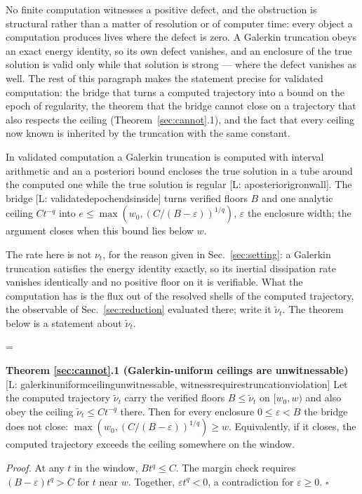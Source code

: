 \documentclass[letterpaper,twocolumn]{article}
\newcommand{\lean}[1]{{\footnotesize\def\_{\textunderscore\allowbreak}%
\hspace{0pt}[L: {\ttfamily\fontdimen3\font=2pt\fontdimen4\font=1pt #1}]}}
\begin{document}
No finite computation witnesses a positive defect, and the obstruction is
structural rather than a matter of resolution or of computer time: every
object a computation produces lives where the defect is zero. A Galerkin
truncation obeys an exact energy identity, so its own defect vanishes,
and an enclosure of the true solution is valid only while that solution
is strong --- where the defect vanishes as well. The rest of this
paragraph makes the statement precise for validated computation: the
bridge that turns a computed trajectory into a bound on the epoch of
regularity, the theorem that the bridge cannot close on a trajectory that
also respects the ceiling (Theorem~\ref{sec:cannot}.1), and the fact that
every ceiling now known is inherited by the truncation with the same
constant.

In validated computation \cite{CheHou23} a Galerkin truncation is
computed with interval arithmetic and an a posteriori bound encloses the
true solution in a tube around the computed one while the true solution
is regular \lean{aposteriori\_gronwall}. The bridge
\lean{validated\_epoch\_ends\_inside} turns verified floors $B$ and one
analytic ceiling $Ct^{-q}$ into $e \leq \max(w_0,
(C/(B-\varepsilon))^{1/q})$, $\varepsilon$ the enclosure width; the
argument closes when this bound lies below $w$.

The rate here is not $\nu_t$, for the reason given in
Sec.~\ref{sec:setting}: a Galerkin truncation satisfies the energy
identity exactly, so its inertial dissipation rate vanishes identically
and no positive floor on it is verifiable. What the computation has is
the flux out of the resolved shells of the computed trajectory, the
observable of Sec.~\ref{sec:reduction} evaluated there; write it
$\tilde\nu_t$. The theorem below is a statement about $\tilde\nu_t$.

\begin{list}{}{\leftmargin=\parindent\rightmargin=0pt}
\item
\textbf{Theorem \ref{sec:cannot}.1 (Galerkin-uniform ceilings are
unwitnessable)}
\lean{galerkin\_uniform\_ceiling\_unwitnessable,
witness\_requires\_truncation\_violation}
Let the computed trajectory $\tilde\nu_t$ carry the verified floors $B
\leq \tilde\nu_t$ on $[w_0,w)$ and also obey the ceiling $\tilde\nu_t \leq
C t^{-q}$ there. Then for every enclosure $0 \leq \varepsilon < B$ the bridge
does not close: $\max(w_0,(C/(B-\varepsilon))^{1/q}) \geq w$.
Equivalently, if it closes, the computed trajectory exceeds the ceiling
somewhere on the window.
\end{list}
{\it Proof.} At any $t$ in the window, $Bt^q \leq C$. The margin check
requires $(B-\varepsilon)t^q > C$ for $t$ near $w$. Together, $\varepsilon
t^q < 0$, a contradiction for $\varepsilon \geq 0$.
\hspace*{\fill}$\square$
\end{document}
